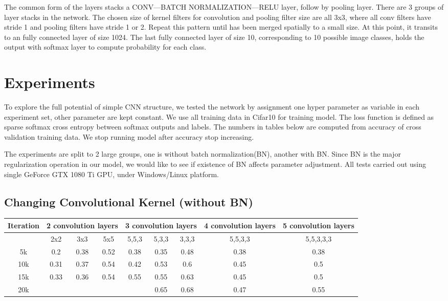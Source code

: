 \documentclass[journal,onecolumn]{IEEEtran}
\begin{document}
The common form of the layers stacks a CONV---BATCH NORMALIZATION---RELU layer, follow by pooling layer. There are 3 groups of layer stacks in the network. The chosen size of kernel filters for convolution and pooling filter size are all 3x3, where all conv filters have stride 1 and pooling filters have stride 1 or 2. Repeat this pattern until has been merged spatially to a small size. At this point, it transits to an fully connected layer of size 1024. The last fully connected layer of size 10, corresponding to 10 possible image classes, holds the output with softmax layer to compute probability for each class.


\section{Experiments}
To explore the full potential of simple CNN structure, we tested the network by assignment one hyper parameter as variable in each experiment set, other parameter are kept constant. We use all training data in Cifar10 for training model. The loss function is defined as sparse softmax cross  entropy between softmax outputs and labels. The numbers in tables below are computed from accuracy of cross validation training data. We stop running model after accuracy stop increasing.

The experiments are split to 2 large groups, one is without batch normalization(BN), another with BN. Since BN is the major regularization operation in our model, we would like to see if existence of BN affects parameter adjustment. All tests carried out using single GeForce GTX 1080 Ti GPU, under Windows/Linux platform. 

\subsection{Changing Convolutional Kernel (without BN)}

\begin{tabular}{*9c}
  \hline
Iteration & \multicolumn{3}{c}{2 convolution layers} & \multicolumn{3}{c}{3 convolution layers} & \multicolumn{1}{c}{4 convolution layers} & \multicolumn{1}{c}{5 convolution layers} \\
\hline
{} & 2x2 & 3x3 & 5x5 & 5,5,3 & 5,3,3 & 3,3,3 & 5,5,3,3 & 5,5,3,3,3 \\
\hline
5k & 0.2 & 0.38 & 0.52 & 0.38 & 0.35 & 0.48 & 0.38 & 0.38 \\
10k & 0.31 & 0.37 & 0.54 & 0.42 & 0.53 & 0.6 & 0.45 & 0.5 \\
15k & 0.33 & 0.36 & 0.54 & 0.55 & 0.55 & 0.63 & 0.45 & 0.5 \\
20k & {} & {} & {} & {} & 0.65 & 0.68 & 0.47 & 0.55 \\
\hline
\end{tabular}
\end{document}
